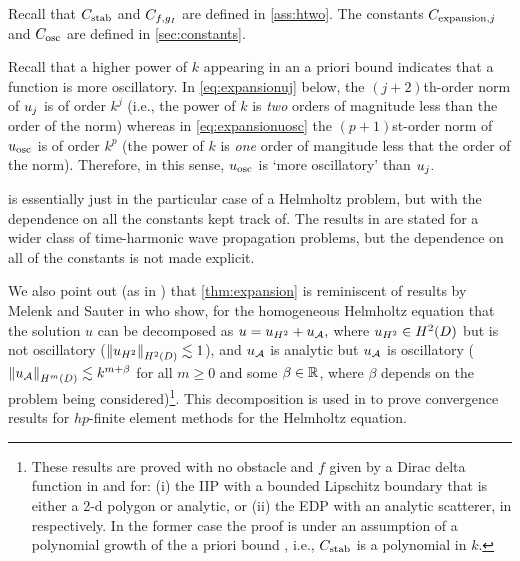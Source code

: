 Recall that $C_{\mathrm{stab}}$ and $C_{f,g_{I}}$ are defined in \cref{ass:htwo}. The constants $C_{\mathrm{expansion},j}$ and $C_{\mathrm{osc}}$ are defined in \cref{sec:constants}.

\label{rem:osc}
Recall that a higher power of $k$ appearing in an a priori bound indicates that a function is more oscillatory. In \cref{eq:expansionuj} below, the $(j+2)$th-order norm of $u_{j}$ is of order $k^j$ (i.e., the power of $k$ is \emph{two} orders of magnitude less than the order of the norm) whereas in \cref{eq:expansionuosc} the $(p+1)$st-order norm of $u_{\mathrm{osc}}$ is of order $k^p$ (the power of $k$ is \emph{one} order of mangitude less that the order of the norm). Therefore, in this sense, $u_{\mathrm{osc}}$ is `more oscillatory' than $u_{j}.$
\ere

 is essentially just \cite[Theorem 1]{ChNi:19} in the particular case of a Helmholtz problem, but with the dependence on all the constants kept track of. The results in \cite{ChNi:19} are stated for a wider class of time-harmonic wave propagation problems, but the dependence on all of the constants is not made explicit.

We also point out (as in \cite[Section 7]{ChNi:19}) that \cref{thm:expansion} is reminiscent of results by Melenk and Sauter in \cite{MeSa:10,MeSa:11}who show, for the homogeneous Helmholtz equation that the solution $u$ can be decomposed as $u = u_{H^{2}} + u_{\mathcal A},$ where $\uHt \in \HtD$ but is not oscillatory ($\NHtD{\uHt} \lesssim 1$), and $u_{\mathcal A}$ is analytic but $u_{\mathcal A}$ is oscillatory ($\NHmD{\uA} \lesssim k^{m+\beta}$ for all $m\geq 0$ and some $\beta \in \mathbb R$, where $\beta$ depends on the problem being considered)\footnote{These results are proved with no obstacle and $f$ given by a Dirac delta function in \cite[Lemma 3.5]{MeSa:10} and for: (i) the IIP with a bounded Lipschitz boundary that is either a 2-d polygon or analytic, or (ii) the EDP with an analytic scatterer, in \cite[Theorems 4.10, 4.20]{MeSa:11} respectively. In the former case the proof is under an assumption of a polynomial growth of the a priori bound \cite[Assumption 4.8]{MeSa:11}, i.e., $C_{\mathrm{stab}}$ is a polynomial in $k$.}. This decomposition is used in \cite{MeSa:10,MeSa:11} to prove convergence results for $hp$-finite element methods for the Helmholtz equation. %


